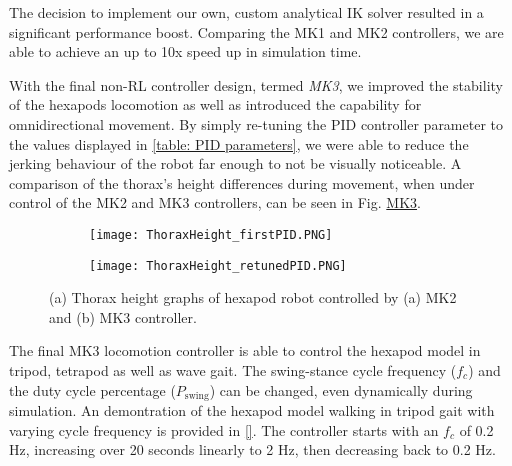 The decision to implement our own, custom analytical IK solver resulted in a significant performance boost.
Comparing the MK1 and MK2 controllers, we are able to achieve an up to 10x speed up in simulation time.

With the final non-RL controller design, termed \textit{MK3}, we improved the stability of the hexapods locomotion as well as introduced the capability for omnidirectional movement.
By simply re-tuning the PID controller parameter to the values displayed in \ref{table: PID parameters}, we were able to reduce the jerking behaviour of the robot far enough to not be visually noticeable.
A comparison of the thorax's height differences during movement, when under control of the MK2 and MK3 controllers, can be seen in Fig. \hyperref[vid: MK1]{MK3}.

\begin{figure}[h]
	\begin{subfigure}{\textwidth} %
		\centering
		\texttt{[image: ThoraxHeight\_firstPID.PNG]}  %
		\caption{}
		\label{figure: Thorax Height graph, bad tuning}
	\end{subfigure}
	
	\begin{subfigure}{\textwidth}
		\centering
		\texttt{[image: ThoraxHeight\_retunedPID.PNG]}   %
		\caption{}
		\label{figure: Thorax height graph, re-tuning}
	\end{subfigure}
	\caption[Thorax height graphs]{(a) Thorax height graphs of hexapod robot controlled by (a) MK2 and (b) MK3 controller.}
	\label{figure: Thorax height graphs}
\end{figure}

The final MK3 locomotion controller is able to control the hexapod model in tripod, tetrapod as well as wave gait.
The swing-stance cycle frequency ($f_c$) and the duty cycle percentage ($P_\text{swing}$) can be changed, even dynamically during simulation.
An demontration of the hexapod model walking in tripod gait with varying cycle frequency is provided in \ref{}.
The controller starts with an $f_c$ of 0.2 Hz, increasing over 20 seconds linearly to 2 Hz, then decreasing back to 0.2 Hz.



